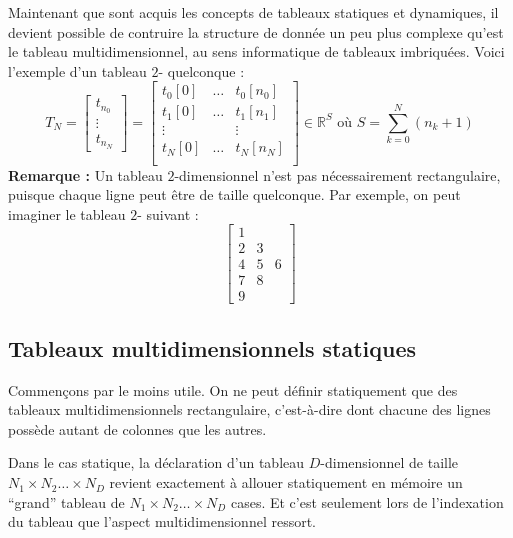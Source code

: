 \documentclass[../../../main.tex]{subfiles}
\begin{document}
Maintenant que sont acquis les concepts de tableaux statiques et dynamiques, il devient possible de contruire la structure de donnée un peu plus complexe qu'est le tableau multidimensionnel, au sens informatique de tableaux imbriquées. Voici l'exemple d'un tableau $2$- quelconque :
\[
T_{N} = \left[{\begin{array}{c}
	t_{n_{0}}\\
	\vdots\\
	t_{n_{N}}
\end{array}
}\right] = \left[ {\begin{array}{ccccc}
		t_{0}[0] & \hdots & t_{0}[n_{0}]\\
		t_{1}[0] & \hdots & t_{1}[n_{1}]\\
		\vdots & & \vdots\\
		t_{N}[0] & \hdots & t_{N}[n_{N}]\\
	\end{array} } \right]
	\in{\mathbb{R}^{S}} \text{ où } S = \displaystyle\sum_{k=0}^{N}(n_{k} + 1)
\]
\textbf{Remarque :} Un tableau $2$-dimensionnel n'est pas nécessairement rectangulaire, puisque chaque ligne peut être de taille quelconque. Par exemple, on peut imaginer le tableau $2$- suivant :
\begin{equation}
	\label{math:triangle_2d_array}
	\left[ {\begin{array}{ccccc}
		1 \\
		2 & 3 \\
		4 & 5 & 6 \\
		7 & 8 \\
		9
	\end{array} } \right]
\end{equation}
\subsection{Tableaux multidimensionnels statiques}
\label{sub:tableaux_multidimensionnels_statiques}
Commençons par le moins utile. On ne peut définir statiquement que des tableaux multidimensionnels rectangulaire, c'est-à-dire dont chacune des lignes possède autant de colonnes que les autres.
 
Dans le cas statique, la déclaration d'un tableau $D$-dimensionnel de taille $N_{1}\times{N_{2}}\dots\times{N_{D}}$ revient exactement à allouer statiquement en mémoire un ``grand'' tableau de $N_{1}\times{N_{2}}\dots\times{N_{D}}$ cases. Et c'est seulement lors de l'indexation du tableau que l'aspect multidimensionnel ressort.
 
\end{document}
